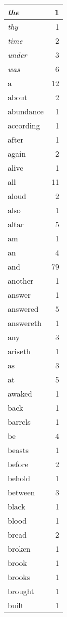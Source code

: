 \begin{center}
\begin{longtable}{l|r}
\emph{the} & 1\\ \hline 
\emph{thy} & 1\\ \hline 
\emph{time} & 2\\ \hline 
\emph{under} & 3\\ \hline 
\emph{was} & 6\\ \hline 
a & 12\\ \hline 
about & 2\\ \hline 
abundance & 1\\ \hline 
according & 1\\ \hline 
after & 1\\ \hline 
again & 2\\ \hline 
alive & 1\\ \hline 
all & 11\\ \hline 
aloud & 2\\ \hline 
also & 1\\ \hline 
altar & 5\\ \hline 
am & 1\\ \hline 
an & 4\\ \hline 
and & 79\\ \hline 
another & 1\\ \hline 
answer & 1\\ \hline 
answered & 5\\ \hline 
answereth & 1\\ \hline 
any & 3\\ \hline 
ariseth & 1\\ \hline 
as & 3\\ \hline 
at & 5\\ \hline 
awaked & 1\\ \hline 
back & 1\\ \hline 
barrels & 1\\ \hline 
be & 4\\ \hline 
beasts & 1\\ \hline 
before & 2\\ \hline 
behold & 1\\ \hline 
between & 3\\ \hline 
black & 1\\ \hline 
blood & 1\\ \hline 
bread & 2\\ \hline 
broken & 1\\ \hline 
brook & 1\\ \hline 
brooks & 1\\ \hline 
brought & 1\\ \hline 
built & 1\\ \hline 

\end{longtable}
\end{center}
